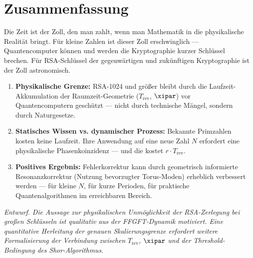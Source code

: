 \section{Zusammenfassung}

Die Zeit ist der Zoll, den man zahlt, wenn man Mathematik in die physikalische
Realität bringt. Für kleine Zahlen ist dieser Zoll erschwinglich — Quantencomputer
können und werden die Kryptographie kurzer Schlüssel brechen. Für RSA-Schlüssel
der gegenwärtigen und zukünftigen Kryptographie ist der Zoll astronomisch.

\begin{foundation}
\begin{enumerate}
    \item \textbf{Physikalische Grenze:} RSA-1024 und größer bleibt durch
    die Laufzeit-Akkumulation der Raumzeit-Geometrie ($T_\text{rev}$, $\xipar$)
    vor Quantencomputern geschützt — nicht durch technische Mängel, sondern
    durch Naturgesetze.

    \item \textbf{Statisches Wissen vs. dynamischer Prozess:} Bekannte Primzahlen
    kosten keine Laufzeit. Ihre Anwendung auf eine neue Zahl $N$ erfordert
    eine physikalische Phasenkoinzidenz — und die kostet $r \cdot T_\text{rev}$.

    \item \textbf{Positives Ergebnis:} Fehlerkorrektur kann durch geometrisch
    informierte Resonanzkorrektur (Nutzung bevorzugter Torus-Moden) erheblich
    verbessert werden — für kleine $N$, für kurze Perioden, für praktische
    Quantenalgorithmen im erreichbaren Bereich.
\end{enumerate}
\end{foundation}

\vspace{0.8cm}
\noindent
\textit{Entwurf. Die Aussage zur physikalischen Unmöglichkeit der RSA-Zerlegung
bei großen Schlüsseln ist qualitativ aus der FFGFT-Dynamik motiviert. Eine
quantitative Herleitung der genauen Skalierungsgrenze erfordert weitere Formalisierung
der Verbindung zwischen $T_\text{rev}$, $\xipar$ und der Threshold-Bedingung des
Shor-Algorithmus.}

